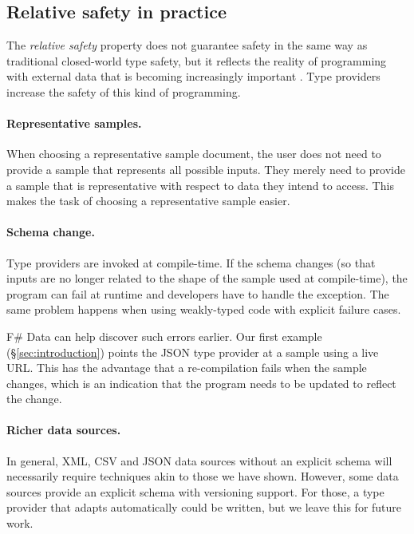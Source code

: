 \documentclass[10pt]{sigplanconf}
\begin{document}
\subsection{Relative safety in practice}
\label{sec:safety-discuss}

The \emph{relative safety} property does not guarantee safety in the same way as traditional
closed-world type safety, but it reflects the reality of programming with external data that is
becoming increasingly important \cite{age-of-web}. Type providers increase the safety of this kind of
programming.

\paragraph{Representative samples.}
When choosing a representative sample document, the user does not need to provide a sample
that represents all possible inputs. They merely need to provide a sample that is representative
with respect to data they intend to access. This makes the task of choosing a representative
sample easier.

\paragraph{Schema change.}
Type providers are invoked at compile-time. If the schema changes (so that inputs are no longer
related to the shape of the sample used at compile-time), the program can fail at runtime and
developers have to handle the exception. The same problem happens when using weakly-typed code
with explicit failure cases.

F\# Data can help discover such errors earlier. Our first example (\S\ref{sec:introduction})
points the JSON type provider at a sample using a live URL. This has the advantage that a
re-compilation fails when the sample changes, which is an indication that the program needs to be
updated to reflect the change.

\paragraph{Richer data sources.}
In general, XML, CSV and JSON data sources without an explicit schema will necessarily require
techniques akin to those we have shown. However, some data sources provide an explicit schema with
versioning support. For those, a type provider that adapts automatically could be written,
but we leave this for future work.

\end{document}
